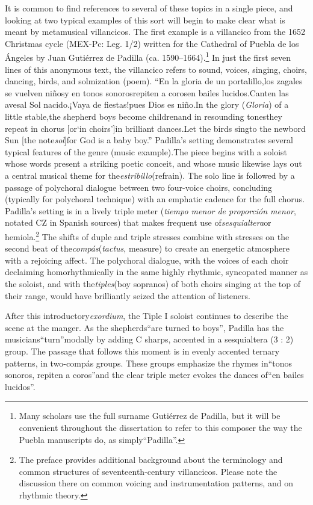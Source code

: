 \documentclass{memoir}
\begin{document}
It is common to find references to several of these topics in a single piece, and looking at two typical examples of this sort will begin to make clear what is meant by metamusical villancicos. The first example is a villancico from the 1652 Christmas cycle (MEX-Pc: Leg. 1/2) written for the Cathedral of Puebla de los Ángeles by Juan Gutiérrez de Padilla (ca. 1590–1664).\footnote{Many scholars use the full surname Gutiérrez de Padilla, but it will be convenient throughout the dissertation to refer to this composer the way the Puebla manuscripts do, as simply\enquote{Padilla}.}
In just the first seven lines of this anonymous text, the villancico refers to sound, voices, singing, choirs, dancing, birds, and solmization (poem).
\enquote{En la gloria de un portalillo,los zagales se vuelven niñosy en tonos sonorosrepiten a corosen bailes lucidos.Canten las avesal Sol nacido.¡Vaya de fiestas!pues Dios es niño.In the glory (\emph{Gloria}) of a little stable,the shepherd boys become childrenand in resounding tonesthey repeat in chorus [or\enquote{in choirs}]in brilliant dances.Let the birds singto the newbord Sun [the note\emph{sol}]for God is a baby boy.}
Padilla’s setting demonstrates several typical features of the genre (music example).The piece begins with a soloist whose words present a striking poetic conceit, and whose music likewise lays out a central musical theme for the\emph{estribillo}(refrain). The solo line is followed by a passage of polychoral dialogue between two four-voice choirs, concluding (typically for polychoral technique) with an emphatic cadence for the full chorus. Padilla’s setting is in a lively triple meter (\emph{tiempo menor de proporción menor}, notated CZ in Spanish sources) that makes frequent use of\emph{sesquialtera}or hemiola.\footnote{The preface provides additional background about the terminology and common structures of seventeenth-century villancicos. Please note the discussion there on common voicing and instrumentation patterns, and on rhythmic theory.}
The shifts of duple and triple stresses combine with stresses on the second beat of the\emph{compás}(\emph{tactus}, measure) to create an energetic atmosphere with a rejoicing affect. The polychoral dialogue, with the voices of each choir declaiming homorhythmically in the same highly rhythmic, syncopated manner as the soloist, and with the\emph{tiples}(boy sopranos) of both choirs singing at the top of their range, would have brilliantly seized the attention of listeners.

After this introductory\emph{exordium}, the Tiple I soloist continues to describe the scene at the manger. As the shepherds\enquote{are turned to boys}, Padilla has the musicians\enquote{turn}modally by adding C sharps, accented in a sesquialtera (3 : 2) group. The passage that follows this moment is in evenly accented ternary patterns, in two-compás groups. These groups emphasize the rhymes in\enquote{tonos sonoros, repiten a coros}and the clear triple meter evokes the dances of\enquote{en bailes lucidos}.
\end{document}
